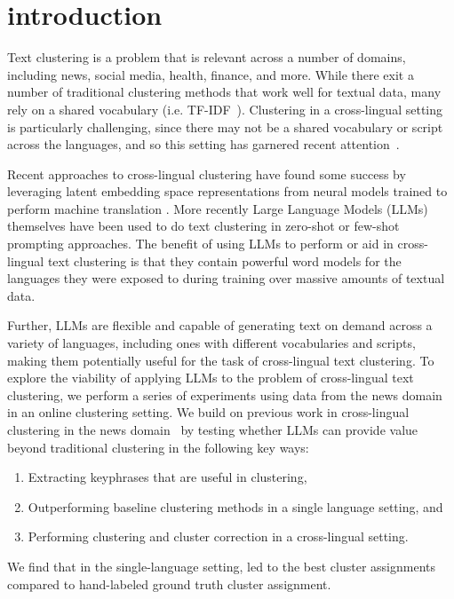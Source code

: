 \section{introduction}\label{section:introduction}

Text clustering is a problem that is relevant across a number of domains, including news, social media, health, finance, and more.
While there exit a number of traditional clustering methods that work well for textual data, many rely on a shared vocabulary (i.e. TF-IDF~).
Clustering in a cross-lingual setting is particularly challenging, since there may not be a shared vocabulary or script across the languages, and so this setting has garnered recent attention~\cite{Schneider2023}.

Recent approaches to cross-lingual clustering have found some success by leveraging latent embedding space representations from neural models trained to perform machine translation .
More recently Large Language Models (LLMs) themselves have been used to do text clustering in zero-shot or few-shot prompting approaches.
The benefit of using LLMs to perform or aid in cross-lingual text clustering is that they contain powerful word models for the languages they were exposed to during training over massive amounts of textual data.

Further, LLMs are flexible and capable of generating text on demand across a variety of languages, including ones with different vocabularies and scripts, making them potentially useful for the task of cross-lingual text clustering.
To explore the viability of applying LLMs to the problem of cross-lingual text clustering, we perform a series of experiments using data from the news domain in an online clustering setting.
We build on previous work in cross-lingual clustering in the news domain~\cite{Schneider2023} by testing whether LLMs can provide value beyond traditional clustering in the following key ways:
\begin{enumerate}
    \item Extracting keyphrases that are useful in clustering,
    \item Outperforming baseline clustering methods in a single language setting, and
    \item Performing clustering and cluster correction in a cross-lingual setting.
\end{enumerate}

We find that in the single-language setting,  led to the best cluster assignments compared to hand-labeled ground truth cluster assignment.

